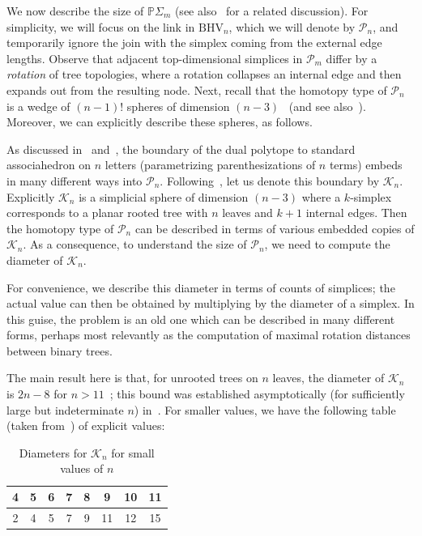 \documentclass[a4paper,11pt]{article}
\newcommand{\BHV}{\textrm{BHV}}
\newcommand{\aK}{\mathcal{K}}
\newcommand{\aP}{\mathcal{P}}
\begin{document}
We now describe the size of $\mathbb{P}\Sigma_m$ (see also~\cite[3.3]{billera2001geometry} for a related discussion).
For simplicity, we will focus on the link in $\BHV_n$, which we will denote by $\aP_n$, and temporarily ignore the join with the simplex coming from the external edge lengths.
Observe that adjacent top-dimensional simplices in $\aP_m$ differ by a {\em rotation} of tree topologies, where a rotation collapses an internal edge and then expands out from the resulting node.
Next, recall that the homotopy type of $\aP_n$ is a wedge of $(n-1)!$ spheres of dimension $(n-3)$~\cite{robinson1996tree} (and see also~\cite[Thm. 6]{devadoss2014polyhedral}).
Moreover, we can explicitly describe these spheres, as follows.

As discussed in~\cite[Prop. 1]{devadoss2014polyhedral} and~\cite[\S 3.1]{billera2001geometry}, the boundary of the dual polytope to standard associahedron on $n$ letters (parametrizing parenthesizations of $n$ terms) embeds in many different ways into $\aP_n$.
Following~\cite{devadoss2014polyhedral}, let us denote this boundary by $\aK_n$.
Explicitly $\aK_n$ is a simplicial sphere of dimension $(n-3)$ where a $k$-simplex corresponds to a planar rooted tree with $n$ leaves and $k+1$ internal edges.
Then the homotopy type of $\aP_n$ can be described in terms of various embedded copies of $\aK_n$.
As a consequence, to understand the size of $\aP_n$, we need to compute the diameter of $\aK_n$.

For convenience, we describe this diameter in terms of counts of simplices; the actual value can then be obtained by multiplying by the diameter of a simplex.
In this guise, the problem is an old one which can be described in many different forms, perhaps most relevantly as the computation of maximal rotation distances between binary trees.

The main result here is that, for unrooted trees on $n$ leaves, the diameter of $\aK_n$ is $2n - 8$ for $n > 11$~\cite{pournin2014diameter}; this bound was established asymptotically (for sufficiently large but indeterminate $n$) in~\cite{sleator1988rotation}.
For smaller values, we have the following table (taken from~\cite[\S2.3]{sleator1988rotation}) of explicit values:

\begin{table}[ht]
    \caption{Diameters for $\aK_n$ for small values of $n$}
    \centering
    \begin{tabular}{c c c c c c c c}
    \hline\hline
    4 & 5 & 6 & 7 & 8 & 9 & 10 & 11 \\
    \hline
    2 & 4 & 5 & 7 & 9 & 11 & 12 & 15 \\
    \hline
    \end{tabular}
\end{table}
\end{document}
